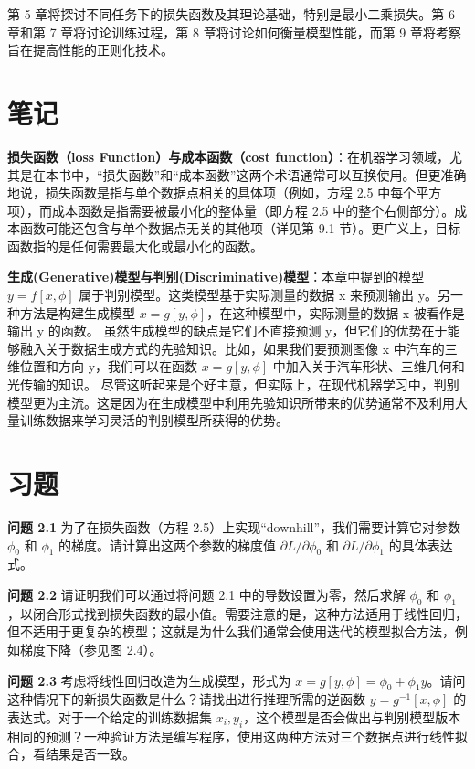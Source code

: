 \documentclass[lang=cn,newtx,10pt,scheme=chinese]{elegantbook}
\begin{document}
第 5 章将探讨不同任务下的损失函数及其理论基础，特别是最小二乘损失。第 6 章和第 7 章将讨论训练过程，第 8 章将讨论如何衡量模型性能，而第 9 章将考察旨在提高性能的正则化技术。

\section{笔记}

\textbf{损失函数（loss Function）与成本函数（cost function）}：在机器学习领域，尤其是在本书中，“损失函数”和“成本函数”这两个术语通常可以互换使用。但更准确地说，损失函数是指与单个数据点相关的具体项（例如，方程 2.5 中每个平方项），而成本函数是指需要被最小化的整体量（即方程 2.5 中的整个右侧部分）。成本函数可能还包含与单个数据点无关的其他项（详见第 9.1 节）。更广义上，目标函数指的是任何需要最大化或最小化的函数。

\textbf{生成(Generative)模型与判别(Discriminative)模型}：本章中提到的模型 $y = f[x, \phi]$ 属于判别模型。这类模型基于实际测量的数据 x 来预测输出 y。另一种方法是构建生成模型 $x = g[y, \phi]$，在这种模型中，实际测量的数据 x 被看作是输出 y 的函数。
虽然生成模型的缺点是它们不直接预测 y，但它们的优势在于能够融入关于数据生成方式的先验知识。比如，如果我们要预测图像 x 中汽车的三维位置和方向 y，我们可以在函数 $x = g[y, \phi]$ 中加入关于汽车形状、三维几何和光传输的知识。
尽管这听起来是个好主意，但实际上，在现代机器学习中，判别模型更为主流。这是因为在生成模型中利用先验知识所带来的优势通常不及利用大量训练数据来学习灵活的判别模型所获得的优势。

\section{习题}

\textbf{问题 2.1} 为了在损失函数（方程 2.5）上实现“downhill”，我们需要计算它对参数 $\phi_0$ 和 $\phi_1$ 的梯度。请计算出这两个参数的梯度值 $\partial L / \partial \phi_0$ 和 $\partial L / \partial \phi_1$ 的具体表达式。

\textbf{问题 2.2} 请证明我们可以通过将问题 2.1 中的导数设置为零，然后求解 $\phi_0$ 和 $\phi_1$，以闭合形式找到损失函数的最小值。需要注意的是，这种方法适用于线性回归，但不适用于更复杂的模型；这就是为什么我们通常会使用迭代的模型拟合方法，例如梯度下降（参见图 2.4）。

\textbf{问题 2.3} 考虑将线性回归改造为生成模型，形式为 $x = g[y, \phi] = \phi_0 + \phi_1 y$。请问这种情况下的新损失函数是什么？请找出进行推理所需的逆函数 $y = g^{-1}[x, \phi]$ 的表达式。对于一个给定的训练数据集 {${x_i,y_i}$}，这个模型是否会做出与判别模型版本相同的预测？一种验证方法是编写程序，使用这两种方法对三个数据点进行线性拟合，看结果是否一致。
\end{document}
